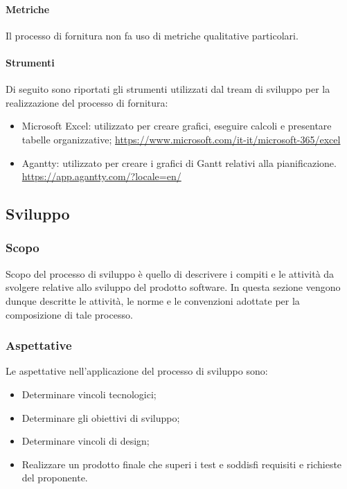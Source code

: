 \paragraph{Metriche}\label{paragraph: metriche_fornitura}
Il processo di fornitura non fa uso di metriche qualitative particolari.
\paragraph{Strumenti}\label{paragraph: strumenti_fornitura}
Di seguito sono riportati gli strumenti utilizzati dal tream di sviluppo per la realizzazione del processo di fornitura:
\begin{itemize}
    \item Microsoft Excel: utilizzato per creare grafici, eseguire calcoli e presentare tabelle organizzative; 
    \url{https://www.microsoft.com/it-it/microsoft-365/excel}
    \item Agantty: utilizzato per creare i grafici di Gantt relativi alla pianificazione. 
    \url{https://app.agantty.com/?locale=en/}
\end{itemize}
\subsection{Sviluppo} \label{subsection:Sviluppo}
    \subsubsection{Scopo} \label{subsubsection:Sviluppo_Scopo}
    Scopo del processo di sviluppo è quello di descrivere i compiti e le attività da svolgere relative allo sviluppo del prodotto software.
    In questa sezione vengono dunque descritte le attività, le norme e le convenzioni adottate per la composizione di tale processo.

    \subsubsection{Aspettative} \label{subsubsection:Sviluppo_Aspettative}
    Le aspettative nell’applicazione del processo di sviluppo sono:
    \begin{itemize}
        \item Determinare vincoli tecnologici;
        \item Determinare gli obiettivi di sviluppo;
        \item Determinare vincoli di design;
        \item Realizzare un prodotto finale che superi i test e soddisfi requisiti e richieste del proponente.
    \end{itemize}

